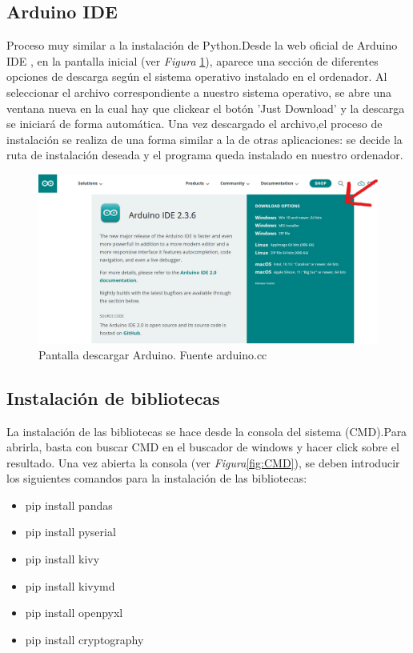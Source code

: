 \subsection{Arduino IDE}
Proceso muy similar a la instalación de Python.Desde la web oficial de Arduino IDE \cite{Arduino}, en la pantalla inicial (ver \textit{Figura} \ref{fig:Arduino}), aparece una sección de diferentes opciones de descarga según el sistema operativo instalado en el ordenador. Al seleccionar el archivo correspondiente a nuestro sistema operativo, se abre una ventana nueva en la cual hay que clickear el botón 'Just Download' y la descarga se iniciará de forma  automática. Una vez descargado el archivo,el proceso de instalación se realiza de una forma similar a la de otras aplicaciones: se decide la ruta de instalación deseada y el programa queda instalado en nuestro ordenador.
    \begin{figure}[h]
        \centering
        \includegraphics[width=1\textwidth]{img/pantalla inicio arduino IDE.png}
        \caption{Pantalla descargar Arduino. Fuente arduino.cc}
        \label{fig:Arduino}
    \end{figure}
\subsection{Instalación de bibliotecas}
La instalación de las bibliotecas se hace desde la consola del sistema (CMD).Para abrirla, basta con buscar CMD en el buscador de windows y hacer click sobre el resultado.
Una vez abierta la consola (ver \textit{Figura}\ref{fig:CMD}), se deben introducir los siguientes comandos para la instalación de las bibliotecas:
\begin{itemize}
    \item pip install pandas
    \item pip install pyserial
    \item pip install kivy 
    \item pip install kivymd
    \item pip install openpyxl
    \item pip install cryptography
\end{itemize}

